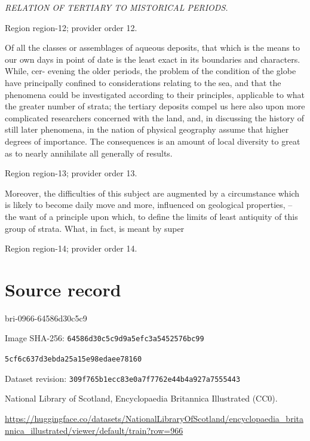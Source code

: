 \documentclass[11pt]{article}
\begin{document}
{\small\itshape RELATION OF TERTIARY TO MISTORICAL PERIODS.\par}

{\scriptsize\color{gray} Region region-12; provider order 12.\par}
\medskip

Of all the classes or assemblages of aqueous deposits, that which is the means to our own days in point of date is the least exact in its boundaries and characters. While, cer- evening the older periods, the problem of the condition of the globe have principally confined to considerations relating to the sea, and that the phenomena could be investigated according to their principles, applicable to what the greater number of strata; the tertiary deposits compel us here also upon more complicated researchers concerned with the land, and, in discussing the history of still later phenomena, in the nation of physical geography assume that higher degrees of importance. The consequences is an amount of local diversity to great as to nearly annihilate all generally of results.
\par

{\scriptsize\color{gray} Region region-13; provider order 13.\par}
\medskip

Moreover, the difficulties of this subject are augmented by a circumstance which is likely to become daily move and more, influenced on geological properties, – the want of a principle upon which, to define the limits of least antiquity of this group of strata. What, in fact, is meant by super
\par

{\scriptsize\color{gray} Region region-14; provider order 14.\par}
\medskip
\newpage\section*{Source record}
bri-0966-64586d30c5c9\par
Image SHA-256: \texttt{64586d30c5c9d9a5efc3a5452576bc99}\par\texttt{5cf6c637d3ebda25a15e98edaee78160}\par
Dataset revision: \texttt{309f765b1ecc83e0a7f7}\texttt{762e44b4a927a7555443}\par
National Library of Scotland, Encyclopaedia Britannica Illustrated (CC0).\par
\url{https://huggingface.co/datasets/NationalLibraryOfScotland/encyclopaedia_britannica_illustrated/viewer/default/train?row=966}
\end{document}
